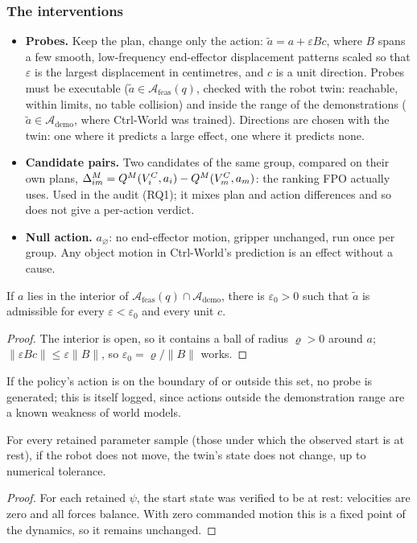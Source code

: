 \subsubsection{The interventions}
\begin{itemize}
\item \textbf{Probes.} Keep the plan, change only the action: $\tilde a=a+\varepsilon Bc$, where $B$ spans a few smooth, low-frequency end-effector displacement patterns scaled so that $\varepsilon$ is the largest displacement in centimetres, and $c$ is a unit direction. Probes must be executable ($\tilde a\in\mathcal A_{\mathrm{feas}}(q)$, checked with the robot twin: reachable, within limits, no table collision) and inside the range of the demonstrations ($\tilde a\in\mathcal A_{\mathrm{demo}}$, where Ctrl-World was trained). Directions are chosen with the twin: one where it predicts a large effect, one where it predicts none.
\item \textbf{Candidate pairs.} Two candidates of the same group, compared on their own plans, $\Delta^M_{im}=Q^M(V^{C}_i,a_i)-Q^M(V^{C}_m,a_m)$: the ranking FPO actually uses. Used in the audit (RQ1); it mixes plan and action differences and so does not give a per-action verdict.
\item \textbf{Null action.} $a_\varnothing$: no end-effector motion, gripper unchanged, run once per group. Any object motion in Ctrl-World's prediction is an effect without a cause.
\end{itemize}
\begin{proposition}\label{method:prop:probe}
If $a$ lies in the interior of $\mathcal A_{\mathrm{feas}}(q)\cap\mathcal A_{\mathrm{demo}}$, there is $\varepsilon_0>0$ such that $\tilde a$ is admissible for every $\varepsilon<\varepsilon_0$ and every unit $c$.
\end{proposition}
\begin{proof}
The interior is open, so it contains a ball of radius $\varrho>0$ around $a$; $\lVert\varepsilon Bc\rVert\le\varepsilon\lVert B\rVert$, so $\varepsilon_0=\varrho/\lVert B\rVert$ works.
\end{proof}
If the policy's action is on the boundary of or outside this set, no probe is generated; this is itself logged, since actions outside the demonstration range are a known weakness of world models.

\begin{proposition}\label{method:prop:null}
For every retained parameter sample (those under which the observed start is at rest), if the robot does not move, the twin's state does not change, up to numerical tolerance.
\end{proposition}
\begin{proof}
For each retained $\psi$, the start state was verified to be at rest: velocities are zero and all forces balance. With zero commanded motion this is a fixed point of the dynamics, so it remains unchanged.
\end{proof}

